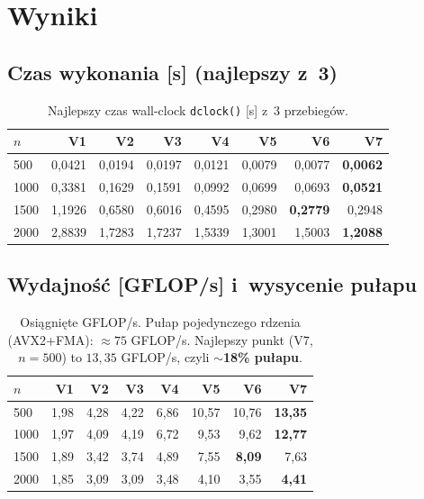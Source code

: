 \documentclass[11pt,a4paper]{article}
\begin{document}
\section{Wyniki}

\subsection{Czas wykonania [s] (najlepszy z~3)}

\begin{table}[H]\centering
\begin{tabular}{lrrrrrrr}
\toprule
$n$ & V1 & V2 & V3 & V4 & V5 & V6 & V7 \\
\midrule
500  & 0{,}0421 & 0{,}0194 & 0{,}0197 & 0{,}0121 & 0{,}0079 & 0{,}0077 & \textbf{0{,}0062} \\
1000 & 0{,}3381 & 0{,}1629 & 0{,}1591 & 0{,}0992 & 0{,}0699 & 0{,}0693 & \textbf{0{,}0521} \\
1500 & 1{,}1926 & 0{,}6580 & 0{,}6016 & 0{,}4595 & 0{,}2980 & \textbf{0{,}2779} & 0{,}2948 \\
2000 & 2{,}8839 & 1{,}7283 & 1{,}7237 & 1{,}5339 & 1{,}3001 & 1{,}5003 & \textbf{1{,}2088} \\
\bottomrule
\end{tabular}
\caption{Najlepszy czas wall-clock \texttt{dclock()} [s] z~3 przebiegów.}
\end{table}

\subsection{Wydajność [GFLOP/s] i~wysycenie pułapu}

\begin{table}[H]\centering
\begin{tabular}{lrrrrrrr}
\toprule
$n$ & V1 & V2 & V3 & V4 & V5 & V6 & V7 \\
\midrule
500  & 1{,}98 & 4{,}28 & 4{,}22 & 6{,}86 & 10{,}57 & 10{,}76 & \textbf{13{,}35} \\
1000 & 1{,}97 & 4{,}09 & 4{,}19 & 6{,}72 & 9{,}53 & 9{,}62 & \textbf{12{,}77} \\
1500 & 1{,}89 & 3{,}42 & 3{,}74 & 4{,}89 & 7{,}55 & \textbf{8{,}09} & 7{,}63 \\
2000 & 1{,}85 & 3{,}09 & 3{,}09 & 3{,}48 & 4{,}10 & 3{,}55 & \textbf{4{,}41} \\
\bottomrule
\end{tabular}
\caption{Osiągnięte GFLOP/s. Pułap pojedynczego rdzenia (AVX2+FMA): $\approx 75$ GFLOP/s.
Najlepszy punkt (V7, $n=500$) to $13{,}35$ GFLOP/s, czyli \textbf{$\sim$18\% pułapu}.}
\end{table}
\end{document}
